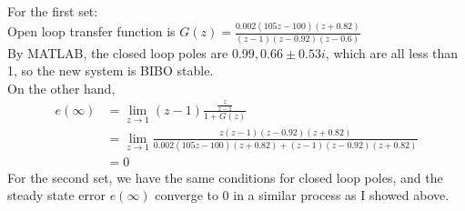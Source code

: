 \documentclass{article}
\begin{document}
\subsection{}

For the first set:\\
Open loop transfer function is
$
G(z) = \frac{0.002(105z-100)(z+0.82)}{(z-1)(z-0.92)(z-0.6)}
$\\
By MATLAB, the closed loop poles are $0.99,0.66\pm0.53i$, which are all less than 1,
so the new system is BIBO stable.
\\On the other hand,
\begin{align*}
    e(\infty)&=\lim_{z\rightarrow1}(z-1)\frac{\frac{z}{z-1}}{1+G(z)}\\
    &= \lim_{z\rightarrow1}\frac{z(z-1)(z-0.92)(z+0.82)}{0.002(105z-100)(z+0.82)+(z-1)(z-0.92)(z+0.82)}\\
    &= 0
\end{align*}
For the second set, we have the same conditions for closed loop poles,
 and the steady state error $e(\infty)$ converge to 0 in a similar process as I showed above.
\end{document}
